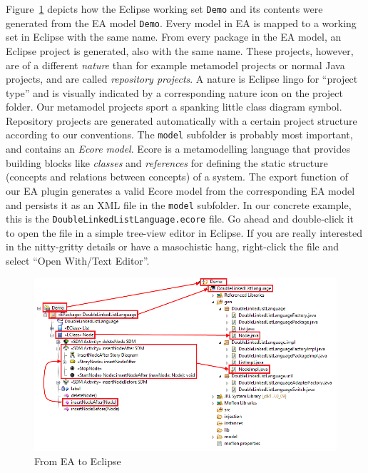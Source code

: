 Figure~\ref{fig_fromEAtoEclipse} depicts how the Eclipse working set \texttt{Demo} and its contents were generated from the EA model \texttt{Demo}.
Every model in EA is mapped to a working set in Eclipse with the same name. 
From every package in the EA model, an Eclipse project is generated, also with the same name.
These projects, however, are of a different \emph{nature} than for example metamodel projects or normal Java projects, and are called \emph{repository projects}.  
A nature is Eclipse lingo for ``project type'' and is visually indicated by a corresponding nature icon on the project folder.
Our  metamodel projects sport a spanking little class diagram symbol. 
Repository projects are generated automatically  with a certain project structure according to our conventions.  
The  \texttt{model} subfolder is probably most important, and contains an  \emph{Ecore model}.  
Ecore is a metamodelling language that provides building  blocks like \emph{classes} and \emph{references} for defining the  static structure (concepts and relations between concepts) of a system.  
The  export function of our EA plugin generates a valid Ecore model from the  corresponding EA model and persists it as an XML file in the \texttt{model}  subfolder.  
In our concrete example, this is the \texttt{DoubleLinkedListLanguage.ecore} file.  
Go ahead and double-click it to open the file in a simple tree-view editor in Eclipse.  
If you are really interested in the nitty-gritty details or have a masochistic hang, right-click the file and select ``Open With/Text Editor''. 

\begin{figure}[htbp]
    \centering
  \includegraphics[width=\textwidth]{pics/installationAndSetup/bothexplorers}
    \caption{From EA to Eclipse}
    \label{fig_fromEAtoEclipse}
\end{figure}

